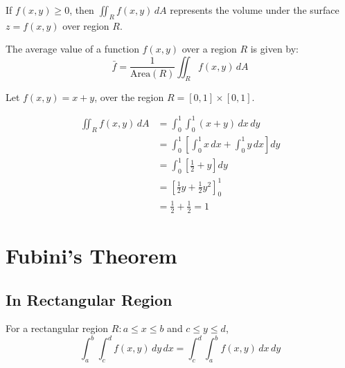 \begin{explanation}
  If \(f(x,y) \geq 0\), then \(\iint_R f(x,y)\,dA\) represents the volume under the surface \(z = f(x,y)\) over region \(R\).
\end{explanation}

\begin{definition}
  \label{def:average-value}
  The average value of a function \(f(x,y)\) over a region \(R\) is given by:
  \begin{equation}\label{eq:average-value}
    \bar{f} = \frac{1}{\text{Area}(R)} \iint_R f(x,y)\,dA
  \end{equation}
\end{definition}

\begin{eg}[Average of \(f(x,y) = x + y\) over Unit Square]
  Let \(f(x,y) = x + y\), over the region \(R = [0,1] \times [0,1]\).

  \begin{align*}
    \iint_R f(x,y)\,dA &= \int_0^1 \int_0^1 (x + y)\,dx\,dy \\
                       &= \int_0^1 \left[ \int_0^1 x\,dx + \int_0^1 y\,dx \right] dy \\
                       &= \int_0^1 \left[ \frac{1}{2} + y \right] dy \\
                       &= \left[ \frac{1}{2}y + \frac{1}{2}y^2 \right]_0^1 \\
                       &= \frac{1}{2} + \frac{1}{2} = 1
  \end{align*}
\end{eg}

\section{Fubini's Theorem}
\label{sec:fubini-s-theorem}

\subsection{In Rectangular Region}
\label{ssec:in-rectangular-region}

\begin{theorem}
  For a rectangular region \(R: a \le x \le b\) and \(c \le y \le d\),
  \begin{equation}\label{eq:fubini-rect}
    \int_{a}^{b} \int_{c}^{d} f(x,y)\,dy\,dx = \int_{c}^{d} \int_{a}^{b} f(x,y)\,dx\,dy
  \end{equation}
\end{theorem}

